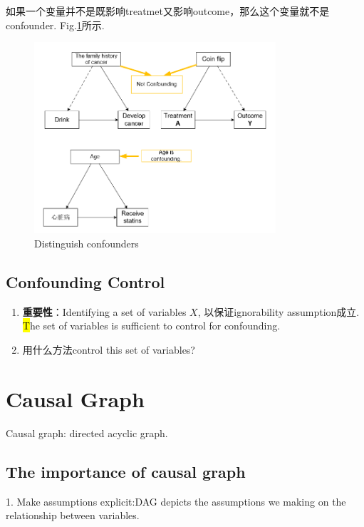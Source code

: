 如果一个变量并不是既影响treatmet又影响outcome，那么这个变量就不是confounder. Fig.\ref{exconfounder}所示.
\begin{figure}[htbp]
	\setlength{\abovecaptionskip}{0pt}     %
	\setlength{\belowcaptionskip}{10pt}
	\vspace{-0cm}  %
	\setlength{\abovecaptionskip}{-0cm}   %
	\setlength{\belowcaptionskip}{-0cm}   %
	\centering
	\includegraphics[width=0.8\textwidth]{figure/exconfounder.png}
	\caption{Distinguish confounders}
	\label{exconfounder}
\end{figure}

\subsection{Confounding Control}
\begin{enumerate}[label=(\arabic*)]
	\item {\bfseries 重要性}：Identifying a set of variables $X$, 以保证ignorability assumption成立. {\hl The set of variables is sufficient to control for confounding.}
	\item 用什么方法control this set of variables?
\end{enumerate}

\section{Causal Graph} \label{Causalgraph}
Causal graph: directed acyclic graph.
\subsection{The importance of causal graph}
1. Make assumptions explicit:DAG depicts the assumptions we making on the relationship between variables.

